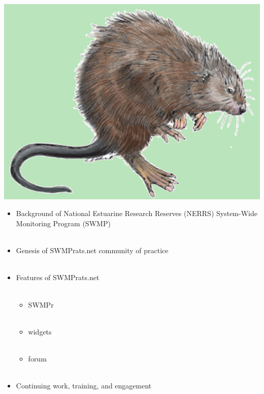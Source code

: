 \documentclass[serif]{beamer}\usepackage[]{graphicx}\usepackage[]{color}
\begin{document}
\begin{frame}{\includegraphics[width=0.05\paperwidth]{fig/muskrat.png}\hspace{0.07in}{\bf Overview}}
\begin{itemize}
\item Background of National Estuarine Research Reserves (NERRS) System-Wide Monitoring Program (SWMP) \\~\\
\item Genesis of SWMPrats.net community of practice \\~\\
\item Features of SWMPrats.net \\~\\
\begin{itemize}
\item SWMPr \\~\\
\item widgets \\~\\
\item forum \\~\\
\end{itemize}
\item Continuing work, training, and engagement
\end{itemize}
\end{frame}
\end{document}
